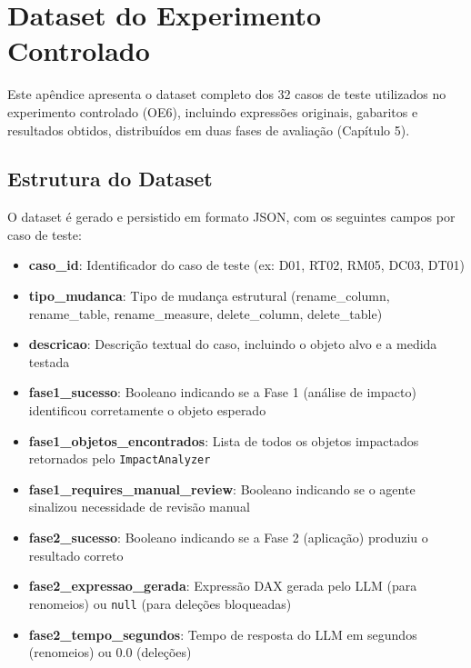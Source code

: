 
\chapter{Dataset do Experimento Controlado}
\label{ap:dataset}

Este apêndice apresenta o dataset completo dos 32 casos de teste utilizados no experimento controlado (OE6), incluindo expressões originais, gabaritos e resultados obtidos, distribuídos em duas fases de avaliação (Capítulo 5).

\section{Estrutura do Dataset}

O dataset é gerado e persistido em formato JSON, com os seguintes campos por caso de teste:

\begin{itemize}
    \item \textbf{caso\_id}: Identificador do caso de teste (ex: D01, RT02, RM05, DC03, DT01)
    \item \textbf{tipo\_mudanca}: Tipo de mudança estrutural (rename\_column, rename\_table, rename\_measure, delete\_column, delete\_table)
    \item \textbf{descricao}: Descrição textual do caso, incluindo o objeto alvo e a medida testada
    \item \textbf{fase1\_sucesso}: Booleano indicando se a Fase 1 (análise de impacto) identificou corretamente o objeto esperado
    \item \textbf{fase1\_objetos\_encontrados}: Lista de todos os objetos impactados retornados pelo \texttt{ImpactAnalyzer}
    \item \textbf{fase1\_requires\_manual\_review}: Booleano indicando se o agente sinalizou necessidade de revisão manual
    \item \textbf{fase2\_sucesso}: Booleano indicando se a Fase 2 (aplicação) produziu o resultado correto
    \item \textbf{fase2\_expressao\_gerada}: Expressão DAX gerada pelo LLM (para renomeios) ou \texttt{null} (para deleções bloqueadas)
    \item \textbf{fase2\_tempo\_segundos}: Tempo de resposta do LLM em segundos (renomeios) ou 0.0 (deleções)
\end{itemize}

